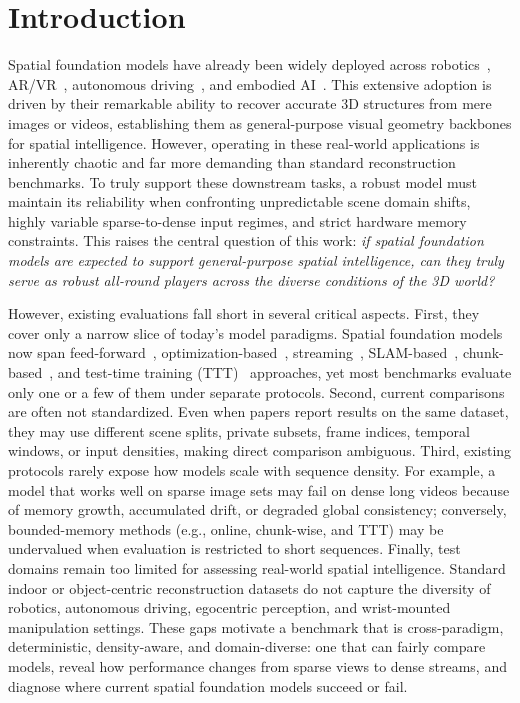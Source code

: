 \section{Introduction}

Spatial foundation models have already been widely deployed across robotics~\citep{yang2026robo3r,lin2025evo,zhang2025spatial}, AR/VR~\citep{yang2026neoverse}, autonomous driving~\citep{chen2025dggt}, and embodied AI~\citep{kareer2025egomimic,zheng2026egoscale}. 
%
This extensive adoption is driven by their remarkable ability to recover accurate 3D structures from mere images or videos, establishing them as general-purpose visual geometry backbones for spatial intelligence. 
%
However, operating in these real-world applications is inherently chaotic and far more demanding than standard reconstruction benchmarks. 
%
To truly support these downstream tasks, a robust model must maintain its reliability when confronting unpredictable scene domain shifts, highly variable sparse-to-dense input regimes, and strict hardware memory constraints. 
%
This raises the central question of this work: \emph{if spatial foundation models are expected to support general-purpose spatial intelligence, can they truly serve as robust all-round players across the diverse conditions of the 3D world?}

However, existing evaluations fall short in several critical aspects. 
%
First, they cover only a narrow slice of today's model paradigms. 
%
Spatial foundation models now span feed-forward~\citep{wang2025vggt,keetha2026mapanything,lin2025depth}, optimization-based~\citep{wang2024dust3r,leroy2024mast3r,zhang2024monst3r}, streaming~\citep{streamVGGT,stream3r2025,chen2026lingbotmap}, SLAM-based~\citep{maggio2025vggt-slam,murai2024_mast3rslam}, chunk-based~\citep{deng2025vggtlong}, and test-time training (TTT)~\citep{chen2025ttt3r,xie2026scal3r,zhang2026loger} approaches, yet most benchmarks evaluate only one or a few of them under separate protocols. 
%
Second, current comparisons are often not standardized. 
%
Even when papers report results on the same dataset, they may use different scene splits, private subsets, frame indices, temporal windows, or input densities, making direct comparison ambiguous. 
%
Third, existing protocols rarely expose how models scale with sequence density. 
%
For example, a model that works well on sparse image sets may fail on dense long videos because of memory growth, accumulated drift, or degraded global consistency; conversely, bounded-memory methods (e.g., online, chunk-wise, and TTT) may be undervalued when evaluation is restricted to short sequences. 
%
Finally, test domains remain too limited for assessing real-world spatial intelligence. 
%
Standard indoor or object-centric reconstruction datasets do not capture the diversity of robotics, autonomous driving, egocentric perception, and wrist-mounted manipulation settings. 
%
These gaps motivate a benchmark that is cross-paradigm, deterministic, density-aware, and domain-diverse: one that can fairly compare models, reveal how performance changes from sparse views to dense streams, and diagnose where current spatial foundation models succeed or fail.

